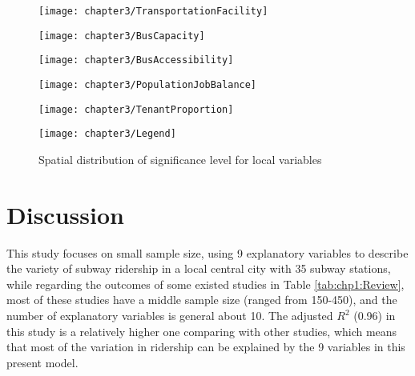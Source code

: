 \begin{figure}[htbp]
	\begin{minipage}{0.48\linewidth}
		\centering
		\texttt{[image: chapter3/TransportationFacility]} %
	\end{minipage}
	\hfill %
	\begin{minipage}{0.48\linewidth}
		\centering
		\texttt{[image: chapter3/BusCapacity]}
	\end{minipage}
	
	\vfill %
	
	\begin{minipage}{0.48\linewidth}
		\centering
		\texttt{[image: chapter3/BusAccessibility]}
	\end{minipage}
	\hfill
	\begin{minipage}{0.48\linewidth}
		\centering
		\texttt{[image: chapter3/PopulationJobBalance]}
	\end{minipage}
	
	\vfill
	
	\begin{minipage}{0.48\linewidth}
		\centering
		\texttt{[image: chapter3/TenantProportion]}
	\end{minipage}
	\hfill
	\begin{minipage}[c]{0.48\linewidth}
		\centering
		\texttt{[image: chapter3/Legend]}\\
	\end{minipage}
	
	\caption{Spatial distribution of significance level for local variables}
	\label{fig:chp3:SignificanceDistribution}
\end{figure}

%
\section{Discussion}
%
This study focuses on small sample size, using 9 explanatory variables to describe the variety of subway ridership in a local central city with 35 subway stations, while regarding the outcomes of some existed studies in Table \ref{tab:chp1:Review}, most of these studies have a middle sample size (ranged from 150-450), and the number of explanatory variables is general about 10. The adjusted $R^2$ (0.96) in this study is a relatively higher one comparing with other studies, which means that most of the variation in ridership can be explained by the 9 variables in this present model. 


